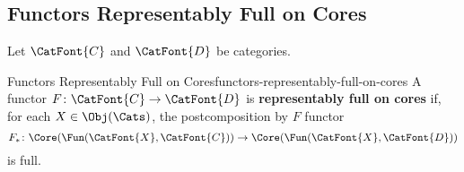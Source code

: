 \subsection{Functors Representably Full on Cores}\label{subsection-functors-representably-full-on-cores}
Let $\CatFont{C}$ and $\CatFont{D}$ be categories.
\begin{definition}{Functors Representably Full on Cores}{functors-representably-full-on-cores}%
    A functor $F\colon\CatFont{C}\to\CatFont{D}$ is \textbf{representably full on cores} if, for each $X\in\Obj(\Cats)$, the postcomposition by $F$ functor
    \[
        F_{*}%
        \colon%
        \Core(\Fun(\CatFont{X},\CatFont{C}))%
        \to
        \Core(\Fun(\CatFont{X},\CatFont{D}))%
    \]%
    is full.
\end{definition}
